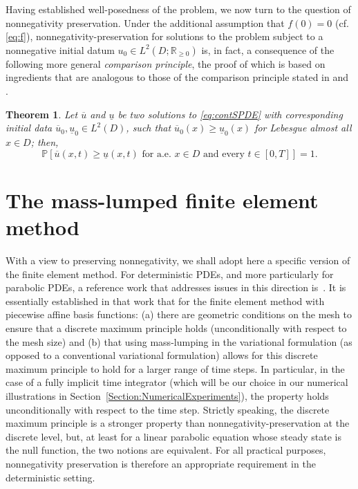 \documentclass[12pt]{article}
\newtheorem{theorem}{Theorem}[section]
\begin{document}
Having established well-posedness of the problem, we now turn to the question of nonnegativity preservation.
Under the additional assumption  that $f(0)=0$ (cf. \eqref{eq:f}), nonnegativity-preservation for solutions to the problem subject to a nonnegative initial datum $u_0 \in L^2(D;\mathbb{R}_{\geq 0})$ is, in fact, a consequence of the following more general \textit{comparison principle}, the proof of which is based on ingredients that are analogous to those of the comparison principle stated in \cite[Theorem 2.1]{donati1993white} and \cite[Theorem 2.5]{Kotelenez-1992}.
%
\begin{theorem}\label{thm_cont_comp}
    Let $\overline{u}$ and $\underline{u}$ be two solutions to \eqref{eq:contSPDE} with  corresponding initial data $\overline{u}_0, \underline{u}_0\in L^2(D)$, such that $\overline{u}_0(x) \geq \underline{u}_0(x)$ for Lebesgue almost all $x \in D$; then,
\begin{equation}
        \mathbb{P} \left[\overline{u}(x,t) \geq \underline{u}(x,t) \text{ for a.e. } x \in D \text{ and every }t \in [0,T] \right] =1. 
    \end{equation}
\end{theorem}


\section{The mass-lumped  finite element method}\label{Section:MLFEM}

With a view to preserving nonnegativity, we shall adopt here a specific version of the  finite element method. For deterministic PDEs, and more particularly for parabolic PDEs, a reference work that addresses issues in this direction is~\cite{fujii1973some}.  It is essentially established in that work that for the  finite element method with piecewise affine basis functions: (a) there are geometric conditions on the mesh to ensure that a discrete maximum principle holds (unconditionally with respect to the mesh size) and (b) that using mass-lumping in the variational formulation (as opposed to a conventional variational formulation) allows for this discrete maximum principle to hold for a larger range of time steps. In particular, in the case of a fully implicit time integrator (which will be our choice in our numerical illustrations in Section~\ref{Section:NumericalExperiments}), the property holds unconditionally with respect to the time step. Strictly speaking, the discrete maximum principle is a stronger property than nonnegativity-preservation at the discrete level, but, at least for a linear parabolic equation whose steady state is the null function, the two notions are equivalent. For all practical purposes, nonnegativity preservation is  therefore an appropriate requirement in the deterministic setting. 
\end{document}
